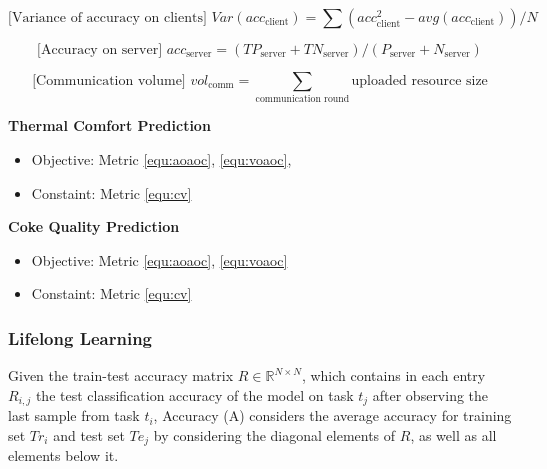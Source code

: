 \begin{equation} \label{equ:voaoc} 
\text{[Variance of accuracy on clients] }
Var(acc_{\text{client}}) = \sum (acc_{\text{client}}^2 - avg(acc_{\text{client}})) / N
\end{equation}

\begin{equation} \label{equ:aos} 
\text{[Accuracy on server] }
acc_{\text{server}} = (TP_{\text{server}} + TN_{\text{server}}) / (P_{\text{server}} + N_{\text{server}} )
\end{equation}

\begin{equation} \label{equ:cv} 
\text{[Communication volume] }
vol_{\text{comm}} = \sum_{\text{communication round}} \text{uploaded resource size}
\end{equation}

\noindent \textbf{Thermal Comfort Prediction}
\begin{itemize}
    \item Objective: Metric \ref{equ:aoaoc}, \ref{equ:voaoc}, 
    \item Constaint: Metric \ref{equ:cv}
\end{itemize}

\noindent \textbf{Coke Quality Prediction}
\begin{itemize}
    \item Objective: Metric \ref{equ:aoaoc}, \ref{equ:voaoc}
    \item Constaint: Metric \ref{equ:cv}
\end{itemize}


\subsubsection{Lifelong Learning}


Given the train-test accuracy matrix $R \in \mathbb{R}^{N \times N}$, which contains in each entry $R_{i,j}$ the test classification accuracy of the model on task $t_j$ after observing the last sample from task $t_i$, Accuracy (A) considers the average accuracy for training set $Tr_i$ and test set $Te_j$ by considering the diagonal elements of $R$, as well as all elements below it. 

